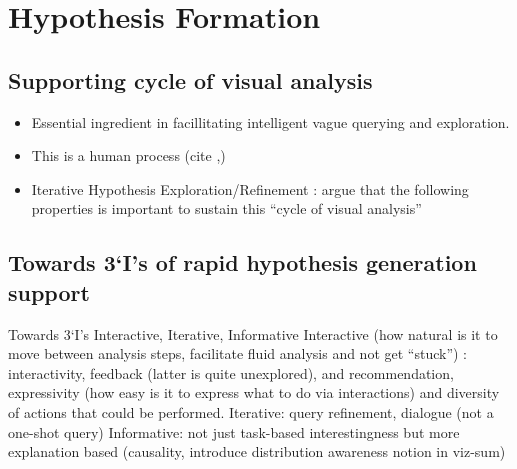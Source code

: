 \section{Hypothesis Formation}
\subsection{Supporting cycle of visual analysis}
\begin{itemize}
	\item Essential ingredient in facillitating intelligent vague querying and exploration.
	\item This is a human process (cite \cite{Heer2012},\cite{Pirolli})
	\item Iterative Hypothesis Exploration/Refinement : argue that the following properties is important to sustain this “cycle of visual analysis” 
\end{itemize}
\subsection{Towards 3‘I’s of rapid hypothesis generation support}
Towards 3‘I’s Interactive, Iterative, Informative
Interactive (how natural is it to move between analysis steps, facilitate fluid analysis and not get “stuck”) : interactivity, feedback (latter is quite unexplored), and recommendation, expressivity (how easy is it to express what to do via interactions) and diversity of actions that could be performed.
Iterative: query refinement, dialogue (not a one-shot query)
Informative: not just task-based interestingness but more explanation based (causality, introduce distribution awareness notion in viz-sum)
